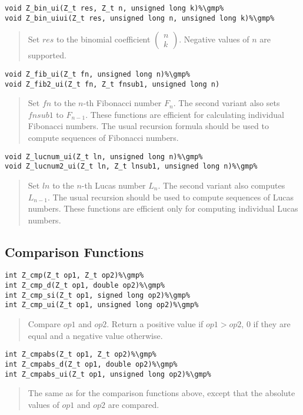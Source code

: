\documentclass[a4paper,10pt]{article}
\newcommand{\gmp}{\hfill[GMP]}
\begin{document}
\begin{lstlisting}
void Z_bin_ui(Z_t res, Z_t n, unsigned long k)%\gmp%
void Z_bin_uiui(Z_t res, unsigned long n, unsigned long k)%\gmp%
\end{lstlisting}
\begin{quote}Set $res$ to the binomial coefficient $\left(\begin{array}{c}n \\ k\end{array}\right)$. Negative values of $n$ are supported.\end{quote}

\begin{lstlisting}
void Z_fib_ui(Z_t fn, unsigned long n)%\gmp%
void Z_fib2_ui(Z_t fn, Z_t fnsub1, unsigned long n)\end{lstlisting}
\begin{quote}Set $fn$ to the $n$-th Fibonacci number $F_n$. The second variant also sets $fnsub1$ to $F_{n-1}$. These functions are efficient for calculating individual Fibonacci numbers. The usual recursion formula should be used to compute sequences of Fibonacci numbers.\end{quote}

\begin{lstlisting}
void Z_lucnum_ui(Z_t ln, unsigned long n)%\gmp%
void Z_lucnum2_ui(Z_t ln, Z_t lnsub1, unsigned long n)%\gmp%
\end{lstlisting}
\begin{quote}Set $ln$ to the $n$-th Lucas number $L_n$. The second variant also computes $L_{n-1}$. The usual recursion should be used to compute sequences of Lucas numbers. These functions are efficient only for computing individual Lucas numbers.\end{quote}

\subsection{Comparison Functions}
\begin{lstlisting}
int Z_cmp(Z_t op1, Z_t op2)%\gmp%
int Z_cmp_d(Z_t op1, double op2)%\gmp%
int Z_cmp_si(Z_t op1, signed long op2)%\gmp%
int Z_cmp_ui(Z_t op1, unsigned long op2)%\gmp%
\end{lstlisting}
\begin{quote}Compare $op1$ and $op2$. Return a positive value if $op1 > op2$, $0$ if they are equal and a negative value otherwise.\end{quote}

\begin{lstlisting}
int Z_cmpabs(Z_t op1, Z_t op2)%\gmp%
int Z_cmpabs_d(Z_t op1, double op2)%\gmp%
int Z_cmpabs_ui(Z_t op1, unsigned long op2)%\gmp%
\end{lstlisting}
\begin{quote}The same as for the comparison functions above, except that the absolute values of $op1$ and $op2$ are compared.\end{quote}
\end{document}
